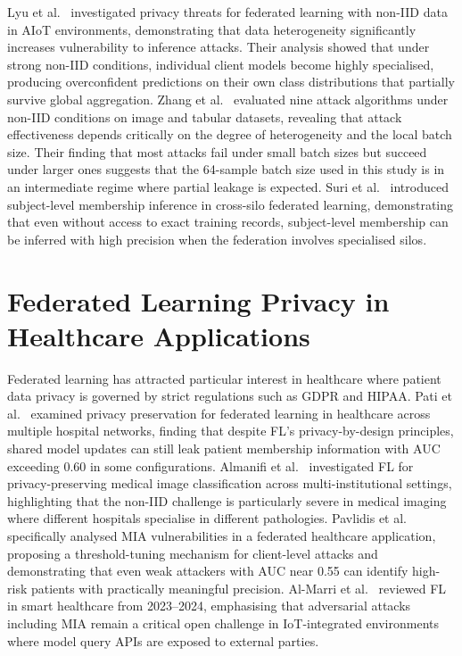 \documentclass[12pt, a4paper]{report}
\begin{document}
Lyu et al.~\cite{lyu2021noniid} investigated privacy threats for federated
learning with non-IID data in AIoT environments, demonstrating that data
heterogeneity significantly increases vulnerability to inference attacks. Their
analysis showed that under strong non-IID conditions, individual client models
become highly specialised, producing overconfident predictions on their own class
distributions that partially survive global aggregation. Zhang et
al.~\cite{zhang2025hard} evaluated nine attack algorithms under non-IID conditions
on image and tabular datasets, revealing that attack effectiveness depends
critically on the degree of heterogeneity and the local batch size. Their finding
that most attacks fail under small batch sizes but succeed under larger ones
suggests that the 64-sample batch size used in this study is in an intermediate
regime where partial leakage is expected. Suri et al.~\cite{suri2022subject}
introduced subject-level membership inference in cross-silo federated learning,
demonstrating that even without access to exact training records, subject-level
membership can be inferred with high precision when the federation involves
specialised silos.

\section{Federated Learning Privacy in Healthcare Applications}

Federated learning has attracted particular interest in healthcare where patient
data privacy is governed by strict regulations such as GDPR and HIPAA. Pati et
al.~\cite{pati2024health} examined privacy preservation for federated learning in
healthcare across multiple hospital networks, finding that despite FL's
privacy-by-design principles, shared model updates can still leak patient
membership information with AUC exceeding 0.60 in some configurations. Almanifi
et al.~\cite{almanifi2025medical} investigated FL for privacy-preserving medical
image classification across multi-institutional settings, highlighting that the
non-IID challenge is particularly severe in medical imaging where different
hospitals specialise in different pathologies. Pavlidis et
al.~\cite{pavlidis2025healthcare} specifically analysed MIA vulnerabilities in a
federated healthcare application, proposing a threshold-tuning mechanism for
client-level attacks and demonstrating that even weak attackers with AUC near
0.55 can identify high-risk patients with practically meaningful precision. Al-Marri
et al.~\cite{almarri2024healthcare} reviewed FL in smart healthcare from 2023--2024,
emphasising that adversarial attacks including MIA remain a critical open challenge
in IoT-integrated environments where model query APIs are exposed to external
parties.
\end{document}
